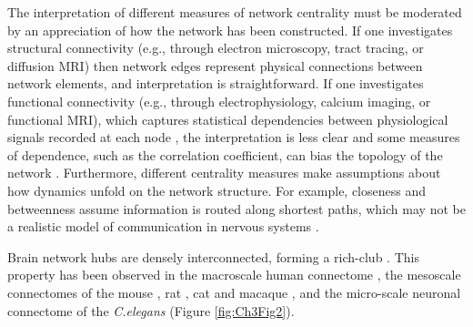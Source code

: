 The interpretation of different measures of network centrality must be moderated by an appreciation of how the network has been constructed. If one investigates structural connectivity (e.g., through electron microscopy, tract tracing, or diffusion MRI) then network edges represent physical connections between network elements, and interpretation is straightforward. If one investigates functional connectivity (e.g., through electrophysiology, calcium imaging, or functional MRI), which captures statistical dependencies between physiological signals recorded at each node \citep{Friston1994}, the interpretation is less clear and some measures of dependence, such as the correlation coefficient, can bias the topology of the network \citep{Power2011,Zalesky2012}. Furthermore, different centrality measures make assumptions about how dynamics unfold on the network structure. For example, closeness and betweenness assume information is routed along shortest paths, which may not be a realistic model of communication in nervous systems \citep{Goni2014,Misic2015a,Seguin2018}.

Brain network hubs are densely interconnected, forming a rich-club \citep{Colizza2006}. This property has been observed in the macroscale human connectome \citep{VandenHeuvel2011}, the mesoscale connectomes of the mouse \citep{Fulcher2016}, rat \citep{VandenHeuvel2016b}, cat \citep{DeReus2013b} and macaque \citep{Harriger2012}, and the micro-scale neuronal connectome of the \textit{C.elegans} \citep{Towlson2013} (Figure \ref{fig:Ch3Fig2}).

